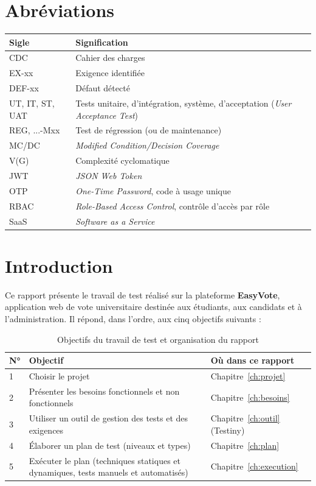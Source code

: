 \documentclass[12pt,a4paper]{report}
\begin{document}
\chapter*{Abréviations}
\begin{tabularx}{\textwidth}{@{}p{2.6cm}X@{}}
\toprule
\rowcolor{evlight}\textbf{Sigle} & \textbf{Signification}\\
\midrule
CDC & Cahier des charges\\
EX-xx & Exigence identifiée\\
DEF-xx & Défaut détecté\\
UT, IT, ST, UAT & Tests unitaire, d'intégration, système, d'acceptation (\textit{User Acceptance Test})\\
REG, ...-Mxx & Test de régression (ou de maintenance)\\
MC/DC & \textit{Modified Condition/Decision Coverage}\\
V(G) & Complexité cyclomatique\\
JWT & \textit{JSON Web Token}\\
OTP & \textit{One-Time Password}, code à usage unique\\
RBAC & \textit{Role-Based Access Control}, contrôle d'accès par rôle\\
SaaS & \textit{Software as a Service}\\
\bottomrule
\end{tabularx}
\clearpage
{}

\chapter*{Introduction}

Ce rapport présente le travail de test réalisé sur la plateforme \textbf{EasyVote}, application web de vote universitaire destinée aux étudiants, aux candidats et à l'administration. Il répond, dans l'ordre, aux cinq objectifs suivants :

\begin{table}[H]
\centering
\caption{Objectifs du travail de test et organisation du rapport}
\small
\begin{tabularx}{\textwidth}{@{}p{0.6cm}Xp{4.2cm}@{}}
\toprule
\rowcolor{evlight}\textbf{N°} & \textbf{Objectif} & \textbf{Où dans ce rapport}\\
\midrule
1 & Choisir le projet & Chapitre~\ref{ch:projet}\\
2 & Présenter les besoins fonctionnels et non fonctionnels & Chapitre~\ref{ch:besoins}\\
3 & Utiliser un outil de gestion des tests et des exigences & Chapitre~\ref{ch:outil} (Testiny)\\
4 & Élaborer un plan de test (niveaux et types) & Chapitre~\ref{ch:plan}\\
5 & Exécuter le plan (techniques statiques et dynamiques, tests manuels et automatisés) & Chapitre~\ref{ch:execution}\\
\bottomrule
\end{tabularx}
\end{table}
\end{document}
